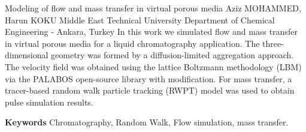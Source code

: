 
    \begin{abstract_online}{Modeling of flow and mass transfer in virtual porous media}{%
        Aziz MOHAMMED, Harun KOKU}{%
        }{%
        Middle East Technical University Department of Chemical Engineering - Ankara, Turkey}
    In this work we simulated flow and mass transfer in virtual porous media for a liquid chromatography application. The three-dimensional geometry was formed by a diffusion-limited aggregation approach. The velocity field was obtained using the lattice Boltzmann methodology (LBM) via the PALABOS open-source library with modification. For mass transfer, a tracer-based random walk particle tracking (RWPT) model was used to obtain pulse simulation results. 
    
        \textbf{Keywords} \newline{}Chromatography, Random Walk, Flow simulation, mass transfer.
    \end{abstract_online}
    